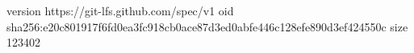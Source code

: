 version https://git-lfs.github.com/spec/v1
oid sha256:e20c801917f6fd0ea3fc918cb0ace87d3ed0abfe446c128efe890d3ef424550c
size 123402
